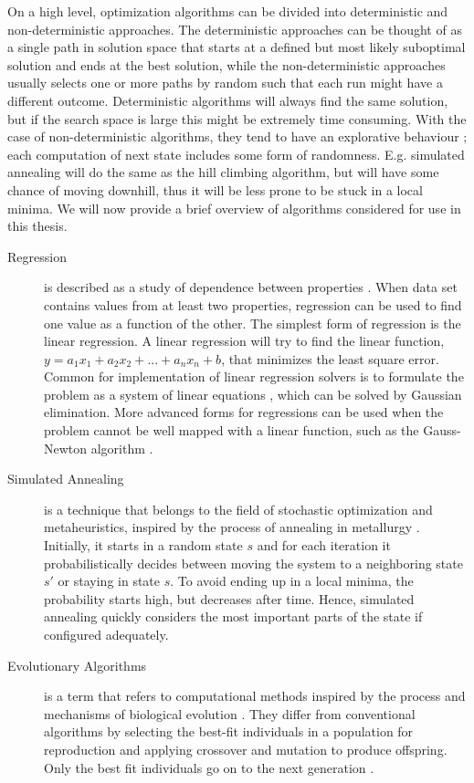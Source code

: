 On a high level, optimization algorithms can be divided into deterministic and
non-deterministic approaches. The deterministic approaches can be thought of as
a single path in solution space that starts at a defined but most likely
suboptimal solution and ends at the best solution, while the non-deterministic
approaches usually selects one or more paths by random such that each run might
have a different outcome. Deterministic algorithms will always find the same
solution, but if the search space is large this might be extremely time
consuming. With the case of non-deterministic algorithms, they tend to have
an explorative behaviour \cite{poli2008field}; each computation of next state
includes some form of randomness. E.g. simulated annealing will do the same as
the hill climbing algorithm, but will have some chance of moving downhill, thus
it will be less prone to be stuck in a local minima. We will now provide a brief
overview of algorithms considered for use in this thesis.


\begin{description}
    \item[Regression] is described as a study of dependence between properties
        \cite{weisberg2005applied}. When data set contains values from at
        least two properties, regression can be used to find one value as a
        function of the other. The simplest form of regression is the linear
        regression. A linear regression will try to find the linear function,
        $y=a_1x_1+a_2x_2+...+a_nx_n+b$, that minimizes the least square error.
        Common for implementation of linear regression solvers is to formulate
        the problem as a system of linear equations \cite{lay2011linear}, which
        can be solved by Gaussian elimination. More advanced forms for
        regressions can be used when the problem cannot be well mapped with a
        linear function, such as the Gauss-Newton algorithm
        \cite{myers1990classical}.

    \item[Simulated Annealing] is a technique that belongs to the field of
        stochastic optimization and metaheuristics, inspired by the process of
        annealing in metallurgy \cite{van1987simulated}. Initially, it starts in
        a random state $s$ and for each iteration it probabilistically decides
        between moving the system to a neighboring state $s'$ or staying in
        state $s$. To avoid ending up in a local minima, the probability starts
        high, but decreases after time. Hence, simulated annealing quickly
        considers the most important parts of the state if configured
        adequately.

    \item[Evolutionary Algorithms] is a term that refers to computational
        methods inspired by the process and mechanisms of biological evolution
        \cite{fogel1997evolutionary}.  They differ from conventional algorithms
        by selecting the best-fit individuals in a population for reproduction
        and applying crossover and mutation to produce offspring. Only the best
        fit individuals go on to the next generation \cite{introtoga}.

\end{description}

